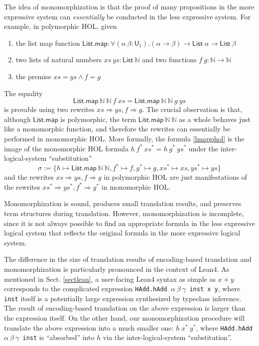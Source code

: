   The idea of monomorphization is that the proof of many propositions in the more expressive
  system can \textit{essentially} be conducted in the less expressive system. For example,
  in polymorphic HOL, given
  \begin{enumerate}
    \item the list map function $\mathsf{List.map} : \forall (\alpha \ \beta : \mathsf{U}_1). (\alpha \to \beta) \to \mathsf{List} \ \alpha \to \mathsf{List} \ \beta$
    \item two lists of natural numbers $xs \ ys : \mathsf{List} \ \mathbb{N}$ and two functions $f \ g : \mathbb{N} \to \mathbb{N}$
    \item the premise $xs = ys \land f = g$
  \end{enumerate}
  The equality
  \begin{equation}\label{lmapphol}
    \mathsf{List.map} \ \mathbb{N} \ \mathbb{N} \ f \ xs = \mathsf{List.map} \ \mathbb{N} \ \mathbb{N} \ g \ ys
  \end{equation}
  is provable using two rewrites $xs \Rightarrow ys, f \Rightarrow g$. The crucial observation is that, although $\textsf{List.map}$ is polymorphic, the term
  $\mathsf{List.map} \ \mathbb{N} \ \mathbb{N}$ as a whole behaves just like a monomorphic function,
  and therefore the rewrites can essentially be performed in monomorphic HOL. More formally,
  the formula \eqref{lmapphol} is the image of the monomorphic HOL formula $h \ f^* \ xs^* = h \ g^* \ ys^*$
  under the inter-logical-system ``substitution''
  $$\sigma := \{h \mapsto \mathsf{List.map} \ \mathbb{N} \ \mathbb{N},
    f^* \mapsto f, g^* \mapsto g, xs^* \mapsto xs, ys^* \mapsto ys\}$$
  and the rewrites $xs \Rightarrow ys, f \Rightarrow g$ in polymorphic HOL are just manifestations of the
  rewrites $xs^* \Rightarrow ys^*, f^* \Rightarrow g^*$ in monomorphic HOL.
  
  Monomorphization is sound, produces small translation results, and preserves
  term structures during translation. However, monomorphization is incomplete,
  since it is not always possible to find an appropriate formula in the less
  expressive logical system that reflects the original formula in the more expressive logical system.


  The difference in the size of translation results of encoding-based translation
  and monomorphization is particularly pronounced in the context of Lean4. As mentioned in Sect. \ref{sectlean},
  a user-facing Lean4 syntax as simple as $x + y$ corresponds to
  the complicated expression \texttt{HAdd.hAdd $\alpha \ \beta \ \gamma$ inst x y}, where \texttt{inst}
  itself is a potentially large expression synthesized by typeclass inference. The result
  of encoding-based translation on the above expression is larger than the expression itself.
  On the other hand, our monomorphization procedure will translate the above expression
  into a much smaller one: $h \ x^* \ y^*$, where \texttt{HAdd.hAdd $\alpha \ \beta \ \gamma$ inst}
  is ``absorbed'' into $h$ via the inter-logical-system ``substitution''.
